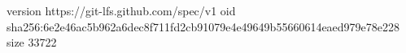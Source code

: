 version https://git-lfs.github.com/spec/v1
oid sha256:6e2e46ac5b962a6dec8f711fd2cb91079e4e49649b55660614eaed979e78e228
size 33722
